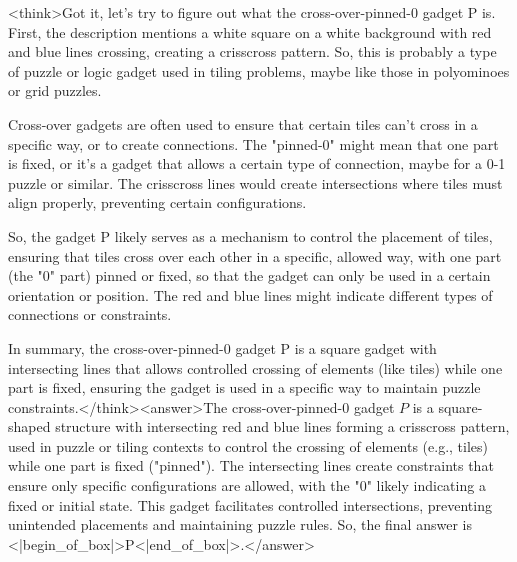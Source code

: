 <think>Got it, let's try to figure out what the cross-over-pinned-0 gadget P is. First, the description mentions a white square on a white background with red and blue lines crossing, creating a crisscross pattern. So, this is probably a type of puzzle or logic gadget used in tiling problems, maybe like those in polyominoes or grid puzzles. 

Cross-over gadgets are often used to ensure that certain tiles can't cross in a specific way, or to create connections. The "pinned-0" might mean that one part is fixed, or it's a gadget that allows a certain type of connection, maybe for a 0-1 puzzle or similar. The crisscross lines would create intersections where tiles must align properly, preventing certain configurations. 

So, the gadget P likely serves as a mechanism to control the placement of tiles, ensuring that tiles cross over each other in a specific, allowed way, with one part (the "0" part) pinned or fixed, so that the gadget can only be used in a certain orientation or position. The red and blue lines might indicate different types of connections or constraints. 

In summary, the cross-over-pinned-0 gadget P is a square gadget with intersecting lines that allows controlled crossing of elements (like tiles) while one part is fixed, ensuring the gadget is used in a specific way to maintain puzzle constraints.</think><answer>The cross-over-pinned-0 gadget \( P \) is a square-shaped structure with intersecting red and blue lines forming a crisscross pattern, used in puzzle or tiling contexts to control the crossing of elements (e.g., tiles) while one part is fixed ("pinned"). The intersecting lines create constraints that ensure only specific configurations are allowed, with the "0" likely indicating a fixed or initial state. This gadget facilitates controlled intersections, preventing unintended placements and maintaining puzzle rules.  
So, the final answer is <|begin_of_box|>P<|end_of_box|>.</answer>